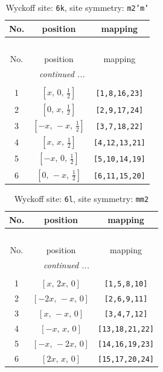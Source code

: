 \documentclass[fleqn,8pt]{jsarticle}
\begin{document}
\renewcommand{\arraystretch}{1.2}
\begin{longtable}{ccc}
\caption{Wyckoff site: {\tt 6k}, site symmetry: {\tt m2'm'}}
 \\
 \hline \hline
No. & position & mapping \\ \hline \endfirsthead

\multicolumn{2}{l}{\tablename\ \thetable{}} \\
 \hline \hline
No. & position & mapping \\ \hline \endhead

 \hline \hline
\multicolumn{2}{r}{\footnotesize\it continued ...} \\ \endfoot

 \hline \hline
\multicolumn{2}{r}{} \\ \endlastfoot

1 & $\left[ x,\, 0,\, \frac{1}{2} \right]$ & {\tt [1,8,16,23]} \\ \hline
2 & $\left[ 0,\, x,\, \frac{1}{2} \right]$ & {\tt [2,9,17,24]} \\ \hline
3 & $\left[ - x,\, - x,\, \frac{1}{2} \right]$ & {\tt [3,7,18,22]} \\ \hline
4 & $\left[ x,\, x,\, \frac{1}{2} \right]$ & {\tt [4,12,13,21]} \\ \hline
5 & $\left[ - x,\, 0,\, \frac{1}{2} \right]$ & {\tt [5,10,14,19]} \\ \hline
6 & $\left[ 0,\, - x,\, \frac{1}{2} \right]$ & {\tt [6,11,15,20]} \\
\end{longtable}
\renewcommand{\arraystretch}{1.2}
\begin{longtable}{ccc}
\caption{Wyckoff site: {\tt 6l}, site symmetry: {\tt mm2}}
 \\
 \hline \hline
No. & position & mapping \\ \hline \endfirsthead

\multicolumn{2}{l}{\tablename\ \thetable{}} \\
 \hline \hline
No. & position & mapping \\ \hline \endhead

 \hline \hline
\multicolumn{2}{r}{\footnotesize\it continued ...} \\ \endfoot

 \hline \hline
\multicolumn{2}{r}{} \\ \endlastfoot

1 & $\left[ x,\, 2 x,\, 0 \right]$ & {\tt [1,5,8,10]} \\ \hline
2 & $\left[ - 2 x,\, - x,\, 0 \right]$ & {\tt [2,6,9,11]} \\ \hline
3 & $\left[ x,\, - x,\, 0 \right]$ & {\tt [3,4,7,12]} \\ \hline
4 & $\left[ - x,\, x,\, 0 \right]$ & {\tt [13,18,21,22]} \\ \hline
5 & $\left[ - x,\, - 2 x,\, 0 \right]$ & {\tt [14,16,19,23]} \\ \hline
6 & $\left[ 2 x,\, x,\, 0 \right]$ & {\tt [15,17,20,24]} \\
\end{longtable}
\end{document}
